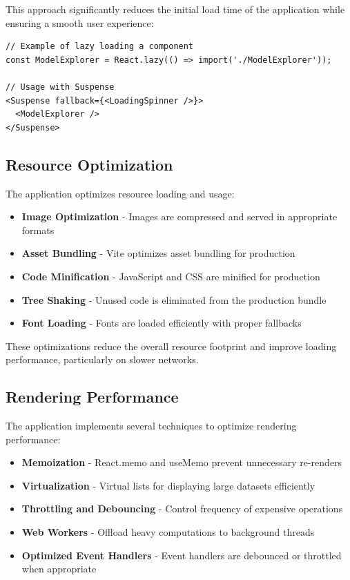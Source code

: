 This approach significantly reduces the initial load time of the application while ensuring a smooth user experience:

\begin{verbatim}
// Example of lazy loading a component
const ModelExplorer = React.lazy(() => import('./ModelExplorer'));

// Usage with Suspense
<Suspense fallback={<LoadingSpinner />}>
  <ModelExplorer />
</Suspense>
\end{verbatim}

\subsection{Resource Optimization}

The application optimizes resource loading and usage:

\begin{itemize}
  \item \textbf{Image Optimization} - Images are compressed and served in appropriate formats
  \item \textbf{Asset Bundling} - Vite optimizes asset bundling for production
  \item \textbf{Code Minification} - JavaScript and CSS are minified for production
  \item \textbf{Tree Shaking} - Unused code is eliminated from the production bundle
  \item \textbf{Font Loading} - Fonts are loaded efficiently with proper fallbacks
\end{itemize}

These optimizations reduce the overall resource footprint and improve loading performance, particularly on slower networks.

\subsection{Rendering Performance}

The application implements several techniques to optimize rendering performance:

\begin{itemize}
  \item \textbf{Memoization} - React.memo and useMemo prevent unnecessary re-renders
  \item \textbf{Virtualization} - Virtual lists for displaying large datasets efficiently
  \item \textbf{Throttling and Debouncing} - Control frequency of expensive operations
  \item \textbf{Web Workers} - Offload heavy computations to background threads
  \item \textbf{Optimized Event Handlers} - Event handlers are debounced or throttled when appropriate
\end{itemize}

